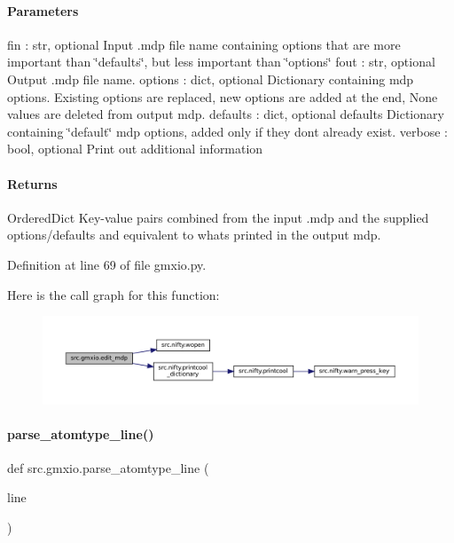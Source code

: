 \paragraph*{Parameters }

fin \+: str, optional Input .mdp file name containing options that are more important than \char`\"{}defaults\char`\"{}, but less important than \char`\"{}options\char`\"{} fout \+: str, optional Output .mdp file name. options \+: dict, optional Dictionary containing mdp options. Existing options are replaced, new options are added at the end, None values are deleted from output mdp. defaults \+: dict, optional defaults Dictionary containing \char`\"{}default\char`\"{} mdp options, added only if they don\textquotesingle{}t already exist. verbose \+: bool, optional Print out additional information

\paragraph*{Returns }

Ordered\+Dict Key-\/value pairs combined from the input .mdp and the supplied options/defaults and equivalent to what\textquotesingle{}s printed in the output mdp. 

Definition at line 69 of file gmxio.\+py.

Here is the call graph for this function\+:
\nopagebreak
\begin{figure}[H]
\begin{center}
\leavevmode
\includegraphics[width=350pt]{namespacesrc_1_1gmxio_aea51f8e8c67deaad0fccdb8bf633a69c_cgraph}
\end{center}
\end{figure}
\mbox{\label{namespacesrc_1_1gmxio_ad77d69866b09dbe5830d9c5f7b48fe84}} 
\paragraph{\texorpdfstring{parse\+\_\+atomtype\+\_\+line()}{parse\_atomtype\_line()}}
{\footnotesize\ttfamily def src.\+gmxio.\+parse\+\_\+atomtype\+\_\+line (\begin{DoxyParamCaption}\item[{}]{line }\end{DoxyParamCaption})}



